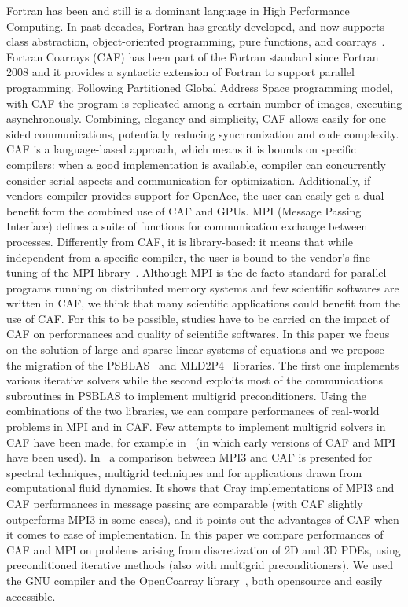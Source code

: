 \documentclass{IOS-Book-Article}
\begin{document}
Fortran has been and still is a dominant language in High Performance Computing. In past decades, Fortran has greatly developed,  and now supports class abstraction, object-oriented programming, pure functions, and coarrays~\cite{Metcalf:2011:MFE}. 
Fortran Coarrays (CAF) has been part of the Fortran standard since Fortran 2008 and it provides a syntactic extension of Fortran to support parallel programming.  
Following Partitioned Global Address Space programming model, with CAF the program is replicated among a certain number of images, executing asynchronously.
Combining, elegancy and simplicity, CAF allows easily for one-sided communications, potentially reducing synchronization and code complexity.
CAF is a language-based approach, which means it is bounds on specific compilers: when a good implementation is available, compiler can concurrently consider serial aspects and communication for optimization. Additionally, if vendors compiler provides support for OpenAcc, the user can easily get a dual benefit form the combined use of CAF and GPUs.  
MPI (Message Passing Interface) defines a suite of functions for communication exchange between processes. Differently from CAF, it is library-based: it means that while independent from a specific compiler, the user is bound to the vendor's fine-tuning of the MPI library~\cite{Garain:2015}.
Although MPI is the de facto standard for parallel programs running on distributed memory systems and few scientific softwares are written in CAF, we think that many scientific applications could benefit from the use of CAF. For this to be possible, studies have to be carried on the impact of CAF on performances and quality of scientific softwares.
In this paper we focus on the solution of large and sparse linear systems of equations and we propose the migration of the PSBLAS~\cite{PSBLAS} and MLD2P4~\cite{mld-toms} libraries. 
The first one implements various iterative solvers while the second exploits most of the communications subroutines in PSBLAS to implement multigrid preconditioners. Using the combinations of the two libraries, we can compare performances of real-world problems in MPI and in CAF.
Few attempts to implement multigrid solvers in CAF have been made, for example in~\cite{Numrich:1998} (in which early versions of CAF and MPI have been used).  In~\cite{Garain:2015} a comparison between MPI3 and CAF is presented for spectral techniques, multigrid techniques and for applications drawn from computational fluid dynamics. It shows that Cray implementations of MPI3 and CAF performances in message passing are comparable (with CAF slightly outperforms MPI3 in some cases), and it points out the advantages of CAF when it comes to ease of implementation.
In this paper we compare performances of CAF and MPI on problems arising from discretization of 2D and 3D PDEs, using preconditioned iterative methods (also with multigrid preconditioners). We used the GNU compiler and the OpenCoarray library~\cite{PGAS14}, both opensource and easily accessible.
\end{document}
